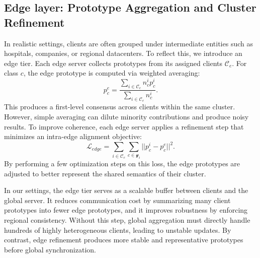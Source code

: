\documentclass[twoside]{article}
\begin{document}
    \subsection{Edge layer: Prototype Aggregation and Cluster Refinement}
        In realistic settings, clients are often grouped under intermediate entities such as hospitals, companies, or regional datacenters. To reflect this, we introduce an edge tier. Each edge server collects prototypes from its assigned clients $\mathcal{C}_e$. For class $c$, the edge prototype is computed via weighted averaging:
        \begin{equation}
            p_c^e = \frac{\sum_{i\in \mathcal{C}_e} n_c^i p_c^i}{\sum_{i \in \mathcal{C}_e} n_c^i}.
        \end{equation}
        This produces a first-level consensus across clients within the same cluster. However, simple averaging can dilute minority contributions and produce noisy results. To improve coherence, each edge server applies a refinement step that minimizes an intra-edge alignment objective:
        \begin{equation}
            \mathcal{L}_{edge} = \sum_{i\in \mathcal{C}_e} \sum_{c\in \mathcal{y}_i} || p_c^i  - p_c^e||^2.
        \end{equation}
        By performing a few optimization steps on this loss, the edge prototypes are adjusted to better represent the shared semantics of their cluster.

        In our settings, the edge tier serves as a scalable buffer between clients and the global server. It reduces communication cost by summarizing many client prototypes into fewer edge prototypes, and it improves robustness by enforcing regional consistency. Without this step, global aggregation must directly handle hundreds of highly heterogeneous clients, leading to unstable updates. By contrast, edge refinement produces more stable and representative prototypes before global synchronization.
\end{document}
